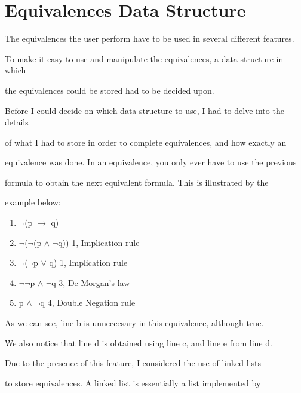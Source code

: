 \documentclass{report}
\begin{document}
\section{Equivalences Data Structure}



The equivalences the user perform have to be used in several different features.

To make it easy to use and manipulate the equivalences, a data structure in which

the equivalences could be stored had to be decided upon. 



Before I could decide on which data structure to use, I had to delve into the details

of what I had to store in order to complete equivalences, and how exactly an

equivalence was done. In an equivalence, you only ever have to use the previous

formula to obtain the next equivalent formula. This is illustrated by the 

example below:



\begin{enumerate}

    \item $\neg$(p $\to$ q)

		\item $\neg$($\neg$(p $\land$ $\neg$q)) \hfill 1, Implication rule

    \item $\neg$($\neg$p $\lor$ q) \hfill 1, Implication rule

    \item $\neg$$\neg$p $\land$ $\neg$q \hfill 3, De Morgan's law

    \item p $\land$ $\neg$q \hfill 4, Double Negation rule

\end{enumerate}



As we can see, line b is unneccesary in this equivalence, although true.

We also notice that line d is obtained using line c, and line e from line d.



Due to the presence of this feature, I considered the use of linked lists

to store equivalences. A linked list is essentially a list implemented by
\end{document}
